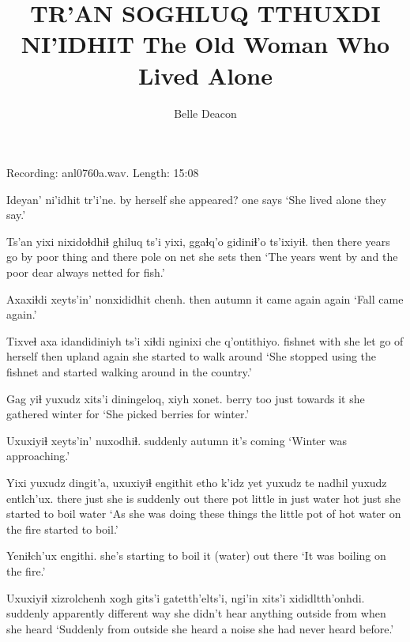 \documentclass[12pt]{article}
\begin{document}
\title{TR'AN SOGHLUQ TTHUXDI NI'IDHIT \newline The Old Woman Who Lived Alone}

\author{Belle Deacon}

\date{}

\maketitle

Recording: anl0760a.wav. Length: 15:08

\bigskip

\gll Ideyan' ni'idhit tr'i'ne.
{by herself} {she appeared?} {one says}
\glt `She lived alone they say.'
\glend

\gll Ts'an yixi nixidoɬdhiɬ ghiluq ts'i yixi, ggaɬq'o gidiniɬ'o ts'ixiyiɬ.
then there {years go by} {poor thing} and there {pole on net} {she sets} then
\glt `The years went by and the poor dear always netted for fish.'
\glend

\gll Axaxiɬdi xeyts'in' nonxididhit chenh.
then autumn {it came again} again
\glt `Fall came again.'
\glend

\gll Tixveɬ axa idandidiniyh ts'i xiɬdi nginixi che q'ontithiyo.
fishnet with {she let go of herself} {} then upland again {she started to walk around}
\glt `She stopped using the fishnet and started walking around in the country.'
\glend

\gll Gag yiɬ yuxudz xits'i diningeloq, xiyh xonet.
berry too just {towards it} {she gathered} winter for
\glt `She picked berries for winter.'
\glend

\gll Uxuxiyiɬ xeyts'in' nuxodhiɬ.
suddenly autumn {it's coming}
\glt `Winter was approaching.'
\glend

\gll Yixi yuxudz dingit'a, uxuxiyiɬ engithit etho k'idz yet yuxudz te nadhil yuxudz entlch'ux.
there just {she is} suddenly {out there} pot little in just water hot just {she started to boil water}
\glt `As she was doing these things the little pot of hot water on the fire started to boil.' 
\glend

\gll Yeniɬch'ux engithi.
{she's starting to boil it (water)} {out there}
\glt `It was boiling on the fire.'
\glend

\gll Uxuxiyiɬ xizrolchenh {xogh gits'i} gatetth'elts'i, ngi'in xits'i xididltth'onhdi.
suddenly apparently {different way} {she didn't hear anything} outside from {when she heard}
\glt `Suddenly from outside she heard a noise she had never heard before.'
\glend
\end{document}
